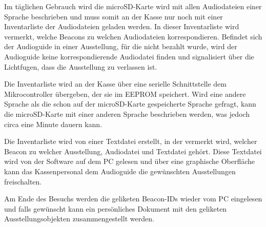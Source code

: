 Im täglichen Gebrauch wird die microSD-Karte wird mit allen Audiodateien einer Sprache beschrieben und muss somit an der Kasse nur noch mit einer Inventarliste der Audiodateien geladen werden.
In dieser Inventarliste wird vermerkt, welche Beacons zu welchen Audiodateien korrespondieren.
Befindet sich der Audioguide in einer Ausstellung, für die nicht bezahlt wurde, wird der Audioguide keine korrespondierende Audiodatei finden und signalisiert über die Lichtfugen, dass die Ausstellung zu verlassen ist.

Die Inventarliste wird an der Kasse über eine serielle Schnittstelle dem Mikrocontroller übergeben, der sie im EEPROM speichert.
Wird eine andere Sprache als die schon auf der microSD-Karte gespeicherte Sprache gefragt, kann die microSD-Karte mit einer anderen Sprache beschrieben werden, was jedoch circa eine Minute dauern kann.

Die Inventarliste wird von einer Textdatei erstellt, in der vermerkt wird, welcher Beacon zu welcher Ausstellung, Audiodatei und Textdatei gehört.
Diese Textdatei wird von der Software auf dem PC gelesen und über eine graphische Oberfläche kann das Kassenpersonal dem Audioguide die gewünschten Ausstellungen freischalten.

Am Ende des Besuchs werden die geliketen Beacon-IDs wieder vom PC eingelesen und falls gewünscht kann ein persönliches Dokument mit den geliketen Ausstellungsobjekten zusammengestellt werden.

